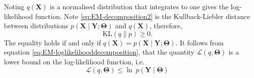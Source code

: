 \documentclass[11pt,draftcls,onecolumn,peerreview]{IEEEtran}
\begin{document}
Noting  $q(\mathbf X)$ is a normalised distribution that integrates to one gives the log-likelihood function. Note \eqref{eq:EM-decomposition2} is the Kullback-Liebler distance between distributions $p(\mathbf X \mid \mathbf Y;\boldsymbol\Theta)$ and $q(\mathbf X)$, therefore,
\begin{equation}
	\mathrm{KL}(q\parallel p)\ge 0.
\end{equation}   
The equality holds if and only if $q(\mathbf X)=p(\mathbf X \mid \mathbf Y;\boldsymbol\Theta)$. It follows from equation \eqref{eq:EM-loglikelihooddecomposition}, that the quantity $\mathcal{L}(q,\boldsymbol\Theta)$ is a lower bound on the log-likelihood function, i.e.
\begin{equation}
 \mathcal{L}(q,\boldsymbol\Theta)\le \ln~p(\mathbf Y\mid\boldsymbol\Theta)
	\end{equation} 
\end{document}
